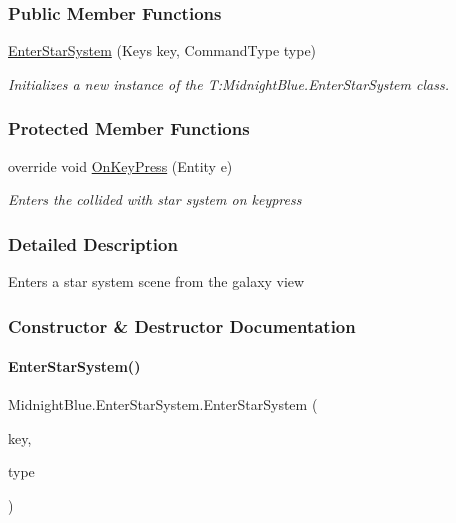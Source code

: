 \subsubsection*{Public Member Functions}
\begin{DoxyCompactItemize}
\item 
\hyperlink{class_midnight_blue_1_1_enter_star_system_a6bea0a7daba691c1b46238114b347377}{Enter\+Star\+System} (Keys key, Command\+Type type)
\begin{DoxyCompactList}\small\item\em Initializes a new instance of the T\+:\+Midnight\+Blue.\+Enter\+Star\+System class. \end{DoxyCompactList}\end{DoxyCompactItemize}
\subsubsection*{Protected Member Functions}
\begin{DoxyCompactItemize}
\item 
override void \hyperlink{class_midnight_blue_1_1_enter_star_system_a1cf84a93760ef0cda918915ec8acfa4d}{On\+Key\+Press} (Entity e)
\begin{DoxyCompactList}\small\item\em Enters the collided with star system on keypress \end{DoxyCompactList}\end{DoxyCompactItemize}


\subsubsection{Detailed Description}
Enters a star system scene from the galaxy view 



\subsubsection{Constructor \& Destructor Documentation}
\hypertarget{class_midnight_blue_1_1_enter_star_system_a6bea0a7daba691c1b46238114b347377}{}\label{class_midnight_blue_1_1_enter_star_system_a6bea0a7daba691c1b46238114b347377} 
\paragraph{\texorpdfstring{Enter\+Star\+System()}{EnterStarSystem()}}
{\footnotesize\ttfamily Midnight\+Blue.\+Enter\+Star\+System.\+Enter\+Star\+System (\begin{DoxyParamCaption}\item[{Keys}]{key,  }\item[{Command\+Type}]{type }\end{DoxyParamCaption})\hspace{0.3cm}{\ttfamily [inline]}}



